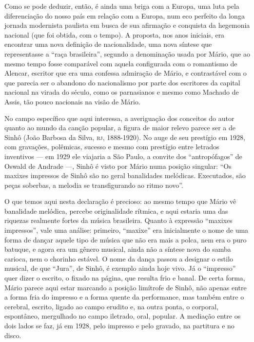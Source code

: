 Como se pode deduzir, então, é ainda uma briga com a Europa, uma luta
pela diferenciação do nosso país em relação com a Europa, num eco
perfeito da longa jornada modernista paulista em busca de sua afirmação
e conquista da hegemonia nacional (que foi obtida, com o tempo). A
proposta, nos anos iniciais, era encontrar uma nova definição de
nacionalidade, uma nova síntese que representasse a ``raça brasileira'',
segundo a denominação usada por Mário, que ao mesmo tempo fosse
comparável com aquela configurada com o romantismo de Alencar, escritor
que era uma confessa admiração de Mário, e contrastável com o que
parecia ser o abandono do nacionalismo por parte dos escritores da
capital nacional na virada do século, como os parnasianos e mesmo como
Machado de Assis, tão pouco nacionais na visão de Mário.

No campo específico que aqui interessa, a averiguação dos conceitos do
autor quanto ao mundo da canção popular, a figura de maior relevo parece
ser a de Sinhô (João Barbosa da Silva, \textsc{rj}, 1888-1920). No auge de seu
prestígio em 1928, com gravações, polêmicas, sucesso e mesmo com
prestígio entre letrados inventivos --- em 1929 ele viajaria a São Paulo,
a convite dos ``antropófagos'' de Oswald de Andrade ---, Sinhô é visto
por Mário numa posição singular: ``Os maxixes impressos de Sinhô são no
geral banalidades melódicas. Executados, são peças soberbas, a melodia
se transfigurando ao ritmo novo''.

O que temos aqui nesta declaração é precioso: ao mesmo tempo que Mário
vê banalidade melódica, percebe originalidade rítmica, e aqui estaria
uma das riquezas realmente fortes da música brasileira. Quanto à
expressão ``maxixes impressos'', vale uma análise: primeiro, ``maxixe''
era inicialmente o nome de uma forma de dançar aquele tipo de música que
não era mais a polca, nem era o puro batuque, e agora era um gênero
musical, ainda não a síntese nova do samba carioca, nem o chorinho
estável. O nome da dança passou a designar o estilo musical, de que
``Jura'', de Sinhô, é exemplo ainda hoje vivo. Já o ``impresso'' quer
dizer o escrito, o fixado na página, que resulta frio e banal. De certa
forma, Mário parece aqui estar marcando a posição limítrofe de Sinhô,
não apenas entre a forma fria do impresso e a forma quente da
performance, mas também entre o cerebral, escrito, ligado ao campo
erudito e, na outra ponta, o corporal, espontâneo, mergulhado no campo
iletrado, oral, popular. A mediação entre os dois lados se faz, já em
1928, pelo impresso e pelo gravado, na partitura e no disco.

